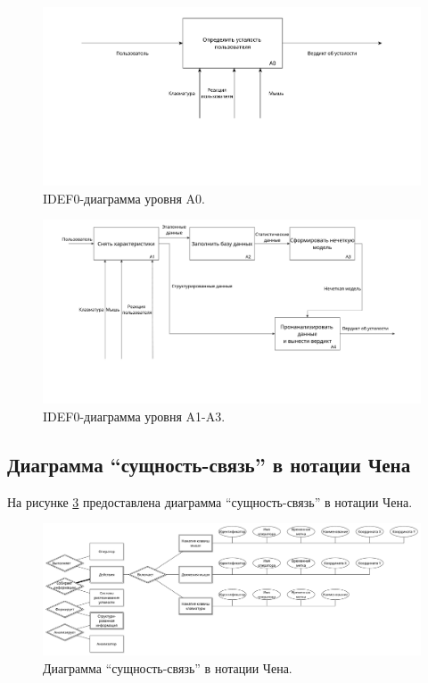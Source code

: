 \begin{figure}[H]
	\centering
	\includegraphics[width=\textwidth]{img/A0.pdf}
	\caption{IDEF0-диаграмма уровня A0.}
	\label{fig:idef:0}
\end{figure}

\begin{figure}[H]
	\centering
	\includegraphics[scale=0.28]{img/A123.pdf}
	\caption{IDEF0-диаграмма уровня A1-A3.}
	\label{fig:idef:1}
\end{figure}

\subsection{Диаграмма ``сущность-связь'' в нотации Чена}
На рисунке \ref{fig:erDiag} предоставлена диаграмма ``сущность-связь'' в нотации Чена.

\begin{figure}[H]
	\centering
	\includegraphics[scale=0.28]{img/chenERDiagram.pdf}
	\caption{Диаграмма ``сущность-связь'' в нотации Чена.}
	\label{fig:erDiag}
\end{figure}

